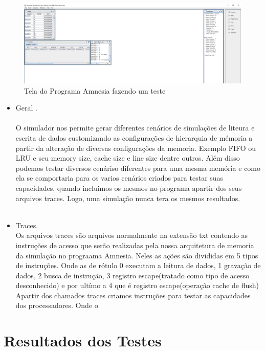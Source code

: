 \documentclass[conference]{IEEEtran}
\begin{document}
\begin{figure}
  \includegraphics[width=\linewidth]{Amnesia_screen.png}
  \caption{Tela do Programa Amnesia fazendo um teste}
  \label{fig:boat1}
\end{figure}

\begin{itemize}
\item  
Geral . \\ \\
O simulador nos permite gerar diferentes cenários de simulações de liteura e escrita de dados
customizando as configurações de hierarquia de mémoria a partir da alteração de diversas configurações da memoria. Exemplo FIFO ou LRU e seu memory size, cache size e line size dentre outros. Além disso podemos testar diversos cenáriso diferentes para uma mesma memória e como ela se comportaria para os varios cenários criados para testar suas capacidades, quando incluimos os mesmos no programa apartir dos seus arquivos traces. Logo, uma simulação nunca tera os mesmos resultados.\\
\\
\item Traces. \\
Os arquivos traces são  arquivos normalmente na extensão txt contendo as instruções de acesso que serão realizadas pela nossa arquitetura de memoria da simulação no prograama Amnesia. Neles as ações são divididas em 5 tipos de instruções. Onde as de rótulo 0 executam a leitura de dados, 1 gravação de dados, 2 busca de instrução, 3 registro escape(tratado como tipo de acesso desconhecido) e por ultímo a 4 que é registro escape(operação cache de flush)
Apartir dos chamados traces criamos instruções para testar as capacidades dos processadores. Onde o 
\
\end{itemize}

\section{Resultados dos Testes}
\end{document}
